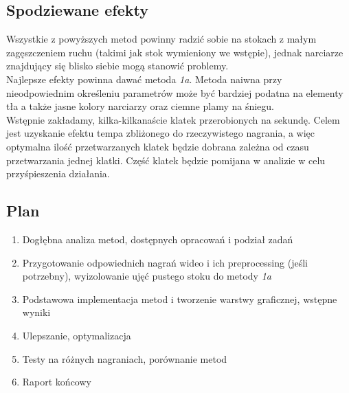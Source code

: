 \documentclass[a4paper]{article}
\begin{document}
\subsection{Spodziewane efekty}
Wszystkie z powyższych metod powinny radzić sobie na stokach z małym zagęszczeniem ruchu (takimi jak stok wymieniony we wstępie), jednak narciarze znajdujący się blisko siebie mogą stanowić problemy.\\
Najlepsze efekty powinna dawać metoda \textit{1a}. Metoda naiwna przy nieodpowiednim określeniu parametrów może być bardziej podatna na elementy tła a także jasne kolory narciarzy oraz ciemne plamy na śniegu.\\
Wstępnie zakładamy, kilka-kilkanaście klatek przerobionych na sekundę. Celem jest uzyskanie efektu tempa zbliżonego do rzeczywistego nagrania, a więc optymalna ilość przetwarzanych klatek będzie dobrana zależna od czasu przetwarzania jednej klatki. Część klatek będzie pomijana w analizie w celu przyśpieszenia działania.

\subsection{Plan}
\begin{enumerate}
\item Dogłębna analiza metod, dostępnych opracowań i podział zadań
\item Przygotowanie odpowiednich nagrań wideo i ich preprocessing (jeśli potrzebny), wyizolowanie ujęć pustego stoku do metody \textit{1a}
\item Podstawowa implementacja metod i tworzenie warstwy graficznej, wstępne wyniki
\item Ulepszanie, optymalizacja
\item Testy na różnych nagraniach, porównanie metod
\item Raport końcowy
\end{enumerate}
\end{document}
